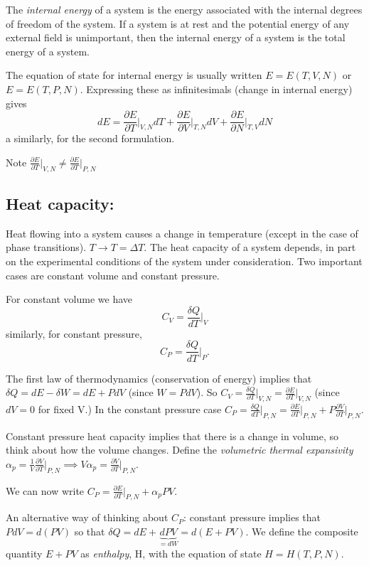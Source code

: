 The \emph{internal energy} of a system is the energy associated with the internal degrees of freedom of the system. If a system is at rest and the potential energy of any external field is unimportant, then the internal energy of a system is the total energy of a system.

The equation of state for internal energy is usually written $E = E(T,V,N)$ or $E = E(T,P,N)$. Expressing these as infinitesimals (change in internal energy) gives
$$ dE = \frac{\partial E}{\partial T}\bigg\vert_{V,N}dT + \frac{\partial E}{\partial V}\bigg\vert_{T,N}dV +\frac{\partial E}{\partial N}\bigg\vert_{T,V}dN$$
a similarly, for the second formulation.

Note $ \frac{\partial E}{\partial T}\vert_{V,N} \neq \frac{\partial E}{\partial T}\vert_{P,N} $

\subsection*{Heat capacity:}
Heat flowing into a system causes a change in temperature (except in the case of phase transitions). $T\rightarrow T=\Delta T$. The heat capacity of a system depends, in part on the experimental conditions of the system under consideration. Two important cases are constant volume and constant pressure.

For constant volume we have
$$C_V = \frac{\delta Q}{dT}\bigg\vert_V$$
similarly, for constant pressure,
$$C_P = \frac{\delta Q}{dT}\bigg\vert_P.$$

The first law of thermodynamics (conservation of energy) implies that $\delta Q = dE - \delta W = dE + PdV$  (since $W = PdV$). So
$C_V = \frac{\delta Q}{\partial T}\vert_{V,N} = \frac{\partial E}{\partial T}\vert_{V,N}$ (since $dV=0$ for fixed V.)
In the constant pressure case $C_P = \frac{\delta Q}{dT}\vert_{P,N} = \frac{\partial E}{\partial T}\vert_{P,N} + P\frac{\partial V}{\partial T}\vert_{P,N}$.

Constant pressure heat capacity implies that there is a change in volume, so think about how the volume changes. Define the \emph{volumetric thermal expansivity} $\alpha_p = \frac{1}{V}\frac{\partial V}{\partial T}\vert_{P,N} \implies V\alpha_p =\frac{\partial V}{\partial T}\vert_{P,N}$.

We can now write $C_P = \frac{\partial E}{\partial T}\vert_{P,N} + \alpha_pPV$.

An alternative way of thinking about $C_P$: constant pressure implies that $PdV = d(PV)$ so that $\delta Q = dE + \underbrace{dPV}_{=dW} = d(E+PV)$. We define the composite quantity $E+PV$ as \emph{enthalpy}, H, with the equation of state $H = H(T,P,N)$.

